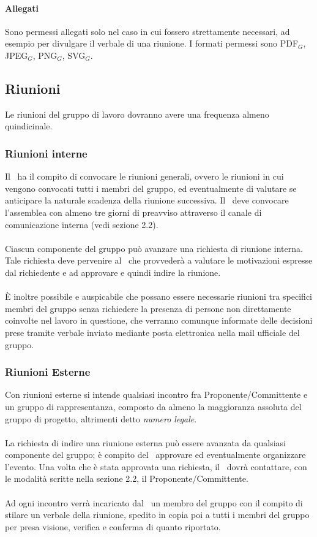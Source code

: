 \paragraph{Allegati}
Sono permessi allegati solo nel caso in cui fossero strettamente necessari, ad esempio per divulgare il verbale di una riunione. I formati permessi sono PDF$_G$, JPEG$_G$, PNG$_G$, SVG$_G$.






\subsection{Riunioni}
Le riunioni del gruppo di lavoro dovranno avere una frequenza almeno quindicinale.
\subsubsection{Riunioni interne}
Il \ruoloResponsabile\ ha il compito di convocare le riunioni generali, ovvero le riunioni in cui vengono convocati tutti i membri del gruppo, ed eventualmente di valutare se anticipare la naturale scadenza della riunione successiva. Il \ruoloResponsabile\ deve convocare l’assemblea con almeno tre giorni di preavviso attraverso il canale di comunicazione interna (vedi sezione 2.2). \\ \\
Ciascun componente del gruppo può avanzare una richiesta di riunione interna.
Tale richiesta deve pervenire al \ruoloResponsabile\ che provvederà a valutare le motivazioni espresse dal richiedente e ad approvare e quindi indire la riunione. \\ \\
È inoltre possibile e auspicabile che possano essere necessarie riunioni tra specifici membri del gruppo senza richiedere la presenza di persone non direttamente coinvolte nel lavoro in questione, che verranno comunque informate delle decisioni prese tramite verbale inviato mediante posta elettronica nella mail ufficiale del gruppo.

\subsubsection{Riunioni Esterne} \label{collaborazioneriunioniesterne}
Con riunioni esterne si intende qualsiasi incontro fra Proponente/Committente
e un gruppo di rappresentanza, composto da almeno la maggioranza assoluta del
gruppo di progetto, altrimenti detto \textit{numero legale}.\\
\\
La richiesta di indire una riunione esterna può essere avanzata da qualsiasi componente del gruppo; è compito del \ruoloResponsabile\ approvare ed eventualmente organizzare l'evento. Una volta che è stata approvata una richiesta, il \ruoloResponsabile\ dovrà contattare, con le modalità scritte nella sezione 2.2, il Proponente/Committente.
\\\\
Ad ogni incontro verrà incaricato dal \ruoloResponsabile\ un membro del gruppo con il compito di stilare un verbale della riunione, spedito in copia poi a tutti i membri del gruppo per presa visione, verifica e conferma di quanto riportato.

